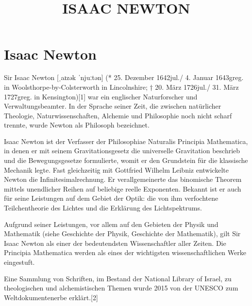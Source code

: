 \title{ISAAC NEWTON}
\section{Isaac Newton}
Sir Isaac Newton [ˌaɪzək ˈnjuːtən] (* 25. Dezember 1642jul./ 4. Januar 1643greg. in Woolsthorpe-by-Colsterworth in Lincolnshire; † 20. März 1726jul./ 31. März 1727greg. in Kensington)[1] war ein englischer Naturforscher und Verwaltungsbeamter. In der Sprache seiner Zeit, die zwischen natürlicher Theologie, Naturwissenschaften, Alchemie und Philosophie noch nicht scharf trennte, wurde Newton als Philosoph bezeichnet.

Isaac Newton ist der Verfasser der Philosophiae Naturalis Principia Mathematica, in denen er mit seinem Gravitationsgesetz die universelle Gravitation beschrieb und die Bewegungsgesetze formulierte, womit er den Grundstein für die klassische Mechanik legte. Fast gleichzeitig mit Gottfried Wilhelm Leibniz entwickelte Newton die Infinitesimalrechnung. Er verallgemeinerte das binomische Theorem mittels unendlicher Reihen auf beliebige reelle Exponenten. Bekannt ist er auch für seine Leistungen auf dem Gebiet der Optik: die von ihm verfochtene Teilchentheorie des Lichtes und die Erklärung des Lichtspektrums.

Aufgrund seiner Leistungen, vor allem auf den Gebieten der Physik und Mathematik (siehe Geschichte der Physik, Geschichte der Mathematik), gilt Sir Isaac Newton als einer der bedeutendsten Wissenschaftler aller Zeiten. Die Principia Mathematica werden als eines der wichtigsten wissenschaftlichen Werke eingestuft.

Eine Sammlung von Schriften, im Bestand der National Library of Israel, zu theologischen und alchemistischen Themen wurde 2015 von der UNESCO zum Weltdokumentenerbe erklärt.[2]



